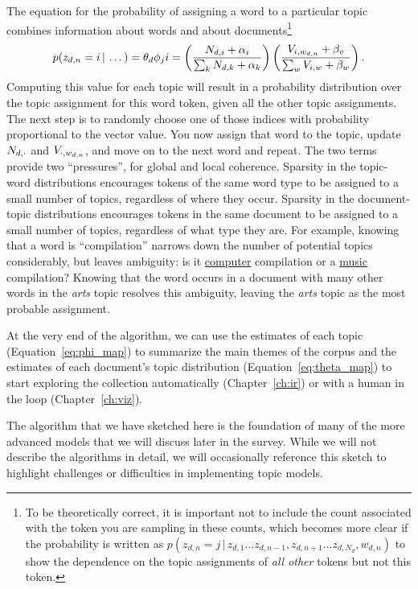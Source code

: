 The equation for the probability of assigning a word to a particular topic
combines information about words and about documents\footnote{To be theoretically correct, it is important
not to include the count associated with the token you are sampling in
these counts, which becomes more clear if the probability is written as
$p(z_{d,n}=j\,|\,z_{d,1}\dots z_{d,n-1},z_{d,n+1}\dots z_{d,N_d}, w_{d,n})$ to
show the dependence on the topic assignments of \emph{all other} tokens but not
this token.}
\begin{align}
p(z_{d,n}=i \, | \, \dots) = \theta_d
\phi_ji= \left(\frac{N_{d,i} + \alpha_i}{\sum_k N_{d,k} + \alpha_k} \right) \left( \frac{V_{i,w_{d,n}} + \beta_v}{\sum_w V_{i,w} +
    \beta_w} \right).
\label{eq:sampling}
\end{align}
Computing this value for each topic will result in a probability distribution over the topic assignment for this word token, given all the other topic assignments.  The next step is to randomly choose one of those indices with
probability proportional to the vector value.  You now assign that word to the
topic, update $N_{d,\cdot}$ and $V_{\cdot,w_{d,n}}$, and move on to the next word and repeat.
The two terms provide two ``pressures'', for global and local coherence. Sparsity in the topic-word distributions encourages tokens of the same word type to be assigned to a small number of topics,  regardless of where they occur. Sparsity in the document-topic distributions encourages tokens in the same document to be assigned to a small number of topics, regardless of what type they are.
For example, knowing that a word is ``compilation'' narrows down the
number of potential topics considerably, but leaves ambiguity: is it
\underline{computer} compilation or a \underline{music} compilation? Knowing that the word occurs in a document with many other words in the \emph{arts} topic resolves this ambiguity, leaving the \emph{arts} topic as the most probable assignment.

At the very end of the algorithm, we can use the estimates of each topic
(Equation~\ref{eq:phi_map}) to summarize the main themes of the corpus and the
estimates of each document's topic distribution (Equation~\ref{eq:theta_map}) to
start exploring the collection automatically (Chapter~\ref{ch:ir}) or with a
human in the loop (Chapter~\ref{ch:viz}).

The algorithm that we have sketched here is the foundation of many of the more
advanced models that we will discuss later in the survey.  While we will not describe
the algorithms in detail, we will occasionally reference this sketch to
highlight challenges or difficulties in implementing topic models.

